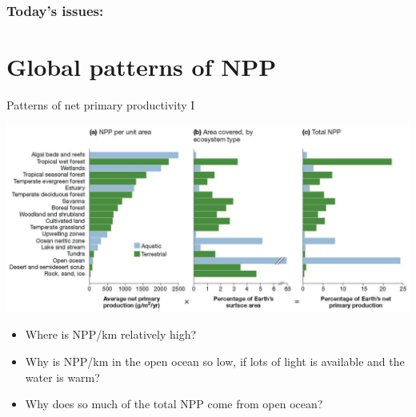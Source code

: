 \begin{noheadline}
\begin{frame}
\frametitle{Today's issues:}
\vspace{5mm}
\tableofcontents
\end{frame}
\end{noheadline}

\section{Global patterns of NPP}

\begin{frame}[t]
    \begin{adjustwidth}{-2em}{-1.5em}
        \vspace{-3mm}
        Patterns of net primary productivity I

        \includegraphics[width=\linewidth]{productivity-by-ecosystems.png}

        \vspace{-1mm}
        \begin{itemize}
            \small
            \item Where is NPP/km relatively high? 

            \item Why is NPP/km in the open ocean so low, if lots of
                light is available and the water is warm? 

            \item Why does so much of the total NPP come from open ocean?
        \end{itemize}

    \end{adjustwidth}
\end{frame}

